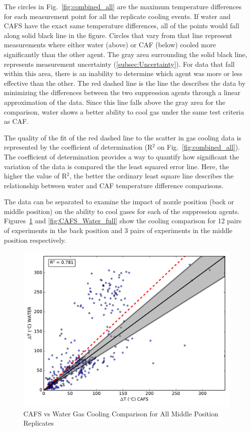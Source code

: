 \documentclass[12pt,oneside]{book}
\begin{document}
The circles in Fig.~\ref{fig:combined_all} are the maximum temperature differences for each measurement point for all the replicate cooling events. If water and CAFS have the exact same temperature differences, all of the points would fall along solid black line in the figure. Circles that vary from that line represent measurements where either water (above) or CAF (below) cooled more significantly than the other agent. The gray area surrounding the solid black line, represents measurement uncertainty (\ref{subsec:Uncertainty}). For data that fall within this area, there is an inability to determine which agent was more or less effective than the other. The red dashed line is the line the describes the data by minimizing the differences between the two suppression agents through a linear approximation of the data. Since this line falls above the gray area for the comparison, water shows a better ability to cool gas under the same test criteria as CAF.

The quality of the fit of the red dashed line to the scatter in gas cooling data is represented by the coefficient of determination (R$^2$ on Fig.~\ref{fig:combined_all}). The coefficient of determination provides a way to quantify how significant the variation of the data is compared the the least squared error line. Here, the higher the value of R$^2$, the better the ordinary least square line describes the relationship between water and CAF temperature difference comparisons. 

The data can be separated to examine the impact of nozzle position (back or middle position) on the ability to cool gases for each of the suppression agents. Figures~\ref{fig:CAFS_Water_mid} and \ref{fig:CAFS_Water_full} show the cooling comparison for 12 pairs of experiments in the back position and 3 pairs of experiments in the middle position respectively.

\begin{figure}[!ht]
	\includegraphics[width=.7\columnwidth]{../Figures/Gas_Cooling/Combined_mid_scatter}
	\caption{CAFS vs Water Gas Cooling Comparison for All Middle Position Replicates}
	\label{fig:CAFS_Water_mid}
\end{figure}
\end{document}

